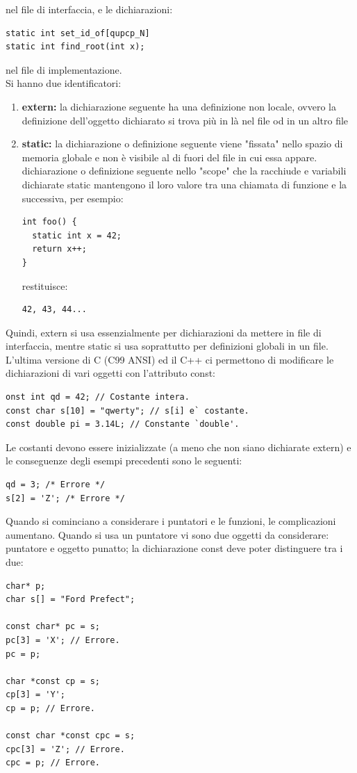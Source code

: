 \documentclass[a4paper,12pt, oneside]{book}
\begin{document}
nel file di interfaccia, e le dichiarazioni:
\begin{verbatim}
static int set_id_of[qupcp_N]
static int find_root(int x);
\end{verbatim}
nel file di implementazione.\\
Si hanno due identificatori:
\begin{enumerate}
\item \textbf{extern:} la dichiarazione seguente ha una definizione non locale, ovvero la
definizione dell'oggetto dichiarato si trova più in là nel file od in un
altro file
\item \textbf{static:} la dichiarazione o definizione seguente viene "fissata" nello spazio
di memoria globale e non è visibile al di fuori del file in cui essa appare. dichiarazione o
definizione seguente nello "scope" che la racchiude e variabili dichiarate static mantengono il loro valore tra una
chiamata di funzione e la successiva, per esempio:
\begin{verbatim}
int foo() {
  static int x = 42;
  return x++;
}
\end{verbatim}
restituisce:
\begin{verbatim}
42, 43, 44...
\end{verbatim}
\end{enumerate}
Quindi, extern si usa essenzialmente per dichiarazioni da
mettere in file di interfaccia, mentre static si usa soprattutto per definizioni globali in un file.\\ 
L'ultima versione di C (C99 ANSI) ed il C++ ci permettono di modificare le dichiarazioni di vari oggetti con l'attributo const:
\begin{verbatim}
onst int qd = 42; // Costante intera.
const char s[10] = "qwerty"; // s[i] e` costante.
const double pi = 3.14L; // Constante `double'.
\end{verbatim}
Le costanti devono essere inizializzate (a meno che non siano
dichiarate extern) e le conseguenze degli esempi precedenti sono le seguenti:
\begin{verbatim}
qd = 3; /* Errore */
s[2] = 'Z'; /* Errore */
\end{verbatim}
Quando si cominciano a considerare i puntatori e le funzioni, le complicazioni aumentano. Quando si usa un puntatore vi sono due oggetti da considerare: puntatore e oggetto punatto; la dichiarazione const deve poter distinguere tra i due:
\begin{verbatim}
char* p;
char s[] = "Ford Prefect";

const char* pc = s;
pc[3] = 'X'; // Errore.
pc = p;

char *const cp = s;
cp[3] = 'Y';
cp = p; // Errore.

const char *const cpc = s;
cpc[3] = 'Z'; // Errore.
cpc = p; // Errore.
\end{verbatim}
\end{document}
